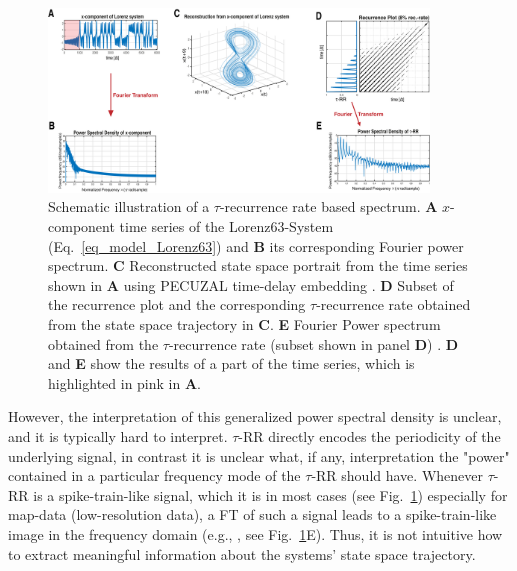 \documentclass[entropy,article,submit,pdftex,moreauthors]{Definitions/mdpi}
\begin{document}
\begin{figure}
 \centering
 \includegraphics[width=0.9\textwidth]{./figures/fig_tau_rr_spectrum_example}
 \caption{Schematic illustration of a $\tau$-recurrence rate based spectrum. \textbf{A} $x$-component time series of the Lorenz63-System (Eq.~\eqref{eq_model_Lorenz63}) and 
 \textbf{B} its corresponding Fourier power spectrum. 
 \textbf{C} Reconstructed state space portrait from the time series shown in \textbf{A} using PECUZAL time-delay embedding \cite{Kraemer2021}. 
 \textbf{D} Subset of the recurrence plot and the corresponding $\tau$-recurrence rate obtained from the state space trajectory in \textbf{C}. 
 \textbf{E} Fourier Power spectrum obtained from the $\tau$-recurrence rate (subset shown in panel \textbf{D}) \cite{Zbilut2008}. \textbf{D} and \textbf{E} show the results of a part of the time series, 
 which is highlighted in pink in \textbf{A}.
 }\label{fig_tau_rr_spectrum_example}
\end{figure}

However, the interpretation of this generalized power spectral density is unclear, and it is typically hard to interpret. $\tau$-RR directly encodes the periodicity of the underlying signal, in contrast it is unclear what, if any, interpretation the "power" contained in a particular frequency mode of the $\tau$-RR should have. Whenever $\tau$-RR is a spike-train-like signal, which it is in most cases (see Fig.~\ref{fig_tau_rr_spectrum_example}) especially for 
map-data (low-resolution data), a FT of such a signal leads to a spike-train-like image in the frequency domain (e.g., \cite{Schild1982,Cordoba1989}, see 
Fig.~\ref{fig_tau_rr_spectrum_example}E). Thus, it is not intuitive how to extract meaningful information about the systems' state space trajectory. 
\end{document}
